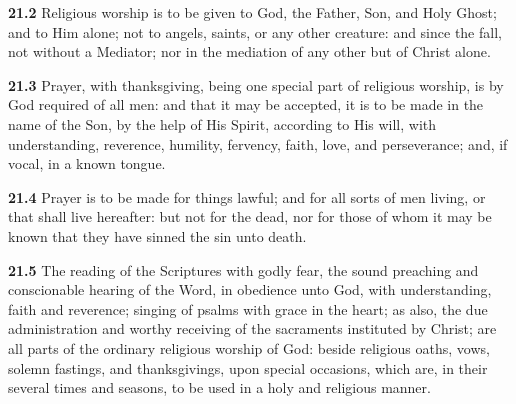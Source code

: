\par\textbf{21.2} Religious worship is to be given to God, the Father, Son, and Holy Ghost; and to Him alone; not to angels, saints, or any other creature: and since the fall, not without a Mediator; nor in the mediation of any other but of Christ alone.   

\par\textbf{21.3} Prayer, with thanksgiving, being one special part of religious worship, is by God required of all men: and that it may be accepted, it is to be made in the name of the Son, by the help of His Spirit, according to His will, with understanding, reverence, humility, fervency, faith, love, and perseverance; and, if vocal, in a known tongue.   

\par\textbf{21.4} Prayer is to be made for things lawful; and for all sorts of men living, or that shall live hereafter: but not for the dead, nor for those of whom it may be known that they have sinned the sin unto death.   

\par\textbf{21.5} The reading of the Scriptures with godly fear, the sound preaching and conscionable hearing of the Word, in obedience unto God, with understanding, faith and reverence; singing of psalms with grace in the heart; as also, the due administration and worthy receiving of the sacraments instituted by Christ; are all parts of the ordinary religious worship of God: beside religious oaths, vows, solemn fastings, and thanksgivings, upon special occasions, which are, in their several times and seasons, to be used in a holy and religious manner.   

